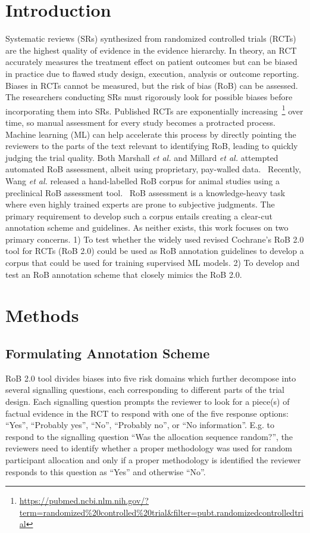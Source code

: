 \documentclass{IOS-Book-Article}
\begin{document}
\section{Introduction}
\label{sec:intro}
%
Systematic reviews (SRs) synthesized from randomized controlled trials (RCTs) are the highest quality of evidence in the evidence hierarchy.
In theory, an RCT accurately measures the treatment effect on patient outcomes but can be biased in practice due to flawed study design, execution, analysis or outcome reporting.~\cite{hariton2018randomised}
Biases in RCTs cannot be measured, but the risk of bias (RoB) can be assessed.
The researchers conducting SRs must rigorously look for possible biases before incorporating them into SRs.
Published RCTs are exponentially increasing~\footnote{\url{https://pubmed.ncbi.nlm.nih.gov/?term=randomized\%20controlled\%20trial&filter=pubt.randomizedcontrolledtrial}} over time, so manual assessment for every study becomes a protracted process.
Machine learning (ML) can help accelerate this process by directly pointing the reviewers to the parts of the text relevant to identifying RoB, leading to quickly judging the trial quality.
Both Marshall \textit{et al.} and Millard \textit{et al.} attempted automated RoB assessment, albeit using proprietary, pay-walled data.~\cite{marshall2015automating,millard2016machine}
Recently, Wang \textit{et al.} released a hand-labelled RoB corpus for animal studies using a preclinical RoB assessment tool.~\cite{wang2022risk}
RoB assessment is a knowledge-heavy task where even highly trained experts are prone to subjective judgments.
The primary requirement to develop such a corpus entails creating a clear-cut annotation scheme and guidelines.
As neither exists, this work focuses on two primary concerns.
1) To test whether the widely used revised Cochrane's RoB 2.0 tool for RCTs (RoB 2.0) could be used as RoB annotation guidelines to develop a corpus that could be used for training supervised ML models.
2) To develop and test an RoB annotation scheme that closely mimics the RoB 2.0.~\cite{lansbury2020co,sterne2019rob}
%
%
%
\section{Methods}
\label{sec:methods}
%
\subsection{Formulating Annotation Scheme}
%
RoB 2.0 tool divides biases into five risk domains which further decompose into several signalling questions, each corresponding to different parts of the trial design.
Each signalling question prompts the reviewer to look for a piece(s) of factual evidence in the RCT to respond with one of the five response options: ``Yes'', ``Probably yes'', ``No'', ``Probably no'', or ``No information''.
E.g. to respond to the signalling question ``Was the allocation sequence random?'', the reviewers need to identify whether a proper methodology was used for random participant allocation and only if a proper methodology is identified the reviewer responds to this question as ``Yes'' and otherwise ``No''.
\end{document}
